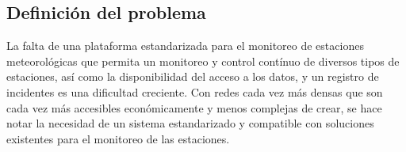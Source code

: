 \subsection{Definición del problema}

La falta de una plataforma estandarizada para el monitoreo de estaciones meteorológicas que permita un monitoreo y control contínuo de diversos tipos de estaciones, así como la disponibilidad del acceso a los datos, y un registro de incidentes es una dificultad creciente. Con redes cada vez más densas que son cada vez más accesibles económicamente y menos complejas de crear, se hace notar la necesidad de un sistema estandarizado y compatible con soluciones existentes para el monitoreo de las estaciones.


